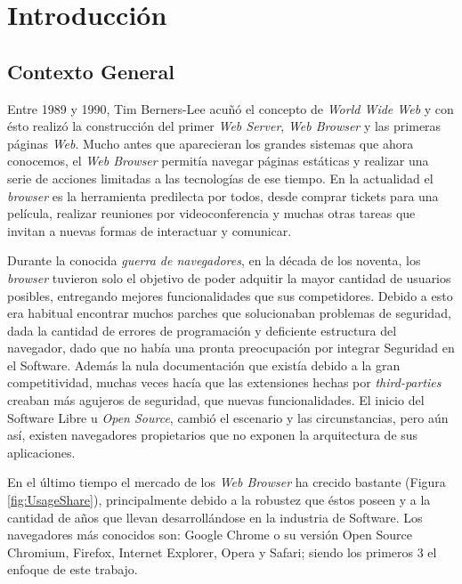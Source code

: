 


\chapter{Introducción}
\label{chap1:intro}


\section{Contexto General}
\label{chap1:CG}

Entre 1989 y 1990, Tim Berners-Lee acuñó el concepto de \textit{World Wide Web} y con ésto realizó la construcción del primer \textit{Web Server}, \textit{Web Browser} y las primeras páginas \textit{Web}. Mucho antes que aparecieran los grandes sistemas que ahora conocemos, el \textit{Web Browser} permitía navegar páginas estáticas y realizar una serie de acciones limitadas a las tecnologías de ese tiempo. En la actualidad el \textit{browser} es la herramienta predilecta por todos, desde comprar tickets para una película, realizar reuniones por videoconferencia y muchas otras tareas que invitan a nuevas formas de interactuar y comunicar.

Durante la conocida \textit{guerra de navegadores}, en la década de los noventa, los \textit{browser} tuvieron solo el objetivo de poder adquitir la mayor cantidad de usuarios posibles, entregando mejores funcionalidades que sus competidores. Debido a esto era habitual encontrar muchos parches que solucionaban problemas de seguridad, dada la cantidad de errores de programación y deficiente estructura del navegador, dado que no había una pronta preocupación por integrar Seguridad en el Software. Además la nula documentación que existía debido a la gran competitividad, muchas veces hacía que las extensiones hechas por \textit{third-parties} creaban más agujeros de seguridad, que nuevas funcionalidades. El inicio del Software Libre u \textit{Open Source}, cambió el escenario y las circunstancias, pero aún así, existen navegadores propietarios que no exponen la arquitectura de sus aplicaciones.

En el último tiempo el mercado de los \textit{Web Browser} ha crecido bastante (Figura \ref{fig:UsageShare}), principalmente debido a la robustez que éstos poseen y a la cantidad de años que llevan desarrollándose en la industria de Software. Los navegadores más conocidos son: Google Chrome o su versión Open Source Chromium, Firefox, Internet Explorer, Opera y Safari; siendo los primeros 3 el enfoque de este trabajo.

